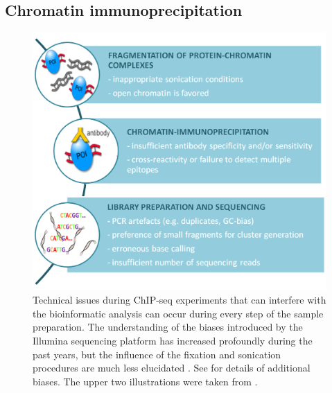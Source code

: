 \subsection{Chromatin immunoprecipitation}
%
\begin{figure}[tb]
 \begin{minipage}[c]{0.65\textwidth}
   \includegraphics[width=\textwidth]{Figures/chip.png}
 \end{minipage}\hfill
 \begin{minipage}[c]{0.3\textwidth}
	\begin{footnotesize}
   \caption[Technical issues during ChIP-seq experiments that can interfere with the bioinformatic analysis.]{\textsf{Technical issues during ChIP-seq experiments that can interfere with the bioinformatic analysis can occur during every step of the sample preparation. The understanding of the biases introduced by the Illumina sequencing platform has increased profoundly during the past years, but the influence of the fixation and sonication procedures are much less elucidated \citep{Teytelman2013, Gavrilov2014}. See  for details of additional biases. The upper two illustrations were taken from \citep{WikiChIP}.}}
\label{fig:ChIPseq}
\end{footnotesize}
 \end{minipage}
\end{figure}
